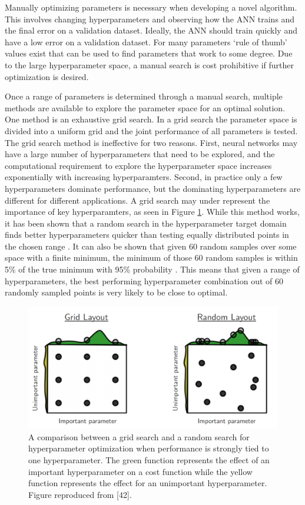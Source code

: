 Manually optimizing parameters is necessary when developing a novel algorithm. This involves changing hyperparameters and observing how the ANN trains and the final error on a validation dataset. Ideally, the ANN should train quickly and have a low error on a validation dataset. For many parameters `rule of thumb' values exist that can be used to find parameters that work to some degree. Due to the large hyperparameter space, a manual search is cost prohibitive if further optimization is desired.

Once a range of parameters is determined through a manual search, multiple methods are available to explore the parameter space for an optimal solution. One method is an exhaustive grid search. In a grid search the parameter space is divided into a uniform grid and the joint performance of all parameters is tested. The grid search method is ineffective for two reasons. First, neural networks may have a large number of hyperparameters that need to be explored, and the computational requirement to explore the hyperparameter space increases exponentially with increasing hyperparamters. Second, in practice only a few hyperparameters dominate performance, but the dominating hyperparameters are different for different applications. A grid search may under represent the importance of key hyperparamters, as seen in Figure \ref{fig:Bergstra12a_hyperparameter_grid_vs_random}.  While this method works, it has been shown that a random search in the hyperparameter target domain finds better hyperparameters quicker than testing equally distributed points in the chosen range \cite{Bergstra2012}. It can also be shown that given 60 random samples over some space with a finite minimum, the minimum of those 60 random samples is within 5\% of the true minimum with 95\% probability \cite{Zheng2015}. This means that given a range of hyperparameters, the best performing hyperparameter combination out of 60 randomly sampled points is very likely to be close to optimal. 

\begin{figure}[H]
	\centering
	\includegraphics[width=0.99\linewidth]{images/Bergstra12a_hyperparameter_grid_vs_random}
	\caption{A comparison between a grid search and a random search for hyperparameter optimization when performance is strongly tied to one hyperparameter. The green function represents the effect of an important hyperparameter on a cost function while the yellow function represents the effect for an unimportant hyperparameter. Figure reproduced from [42].}
	\label{fig:Bergstra12a_hyperparameter_grid_vs_random}
\end{figure}


